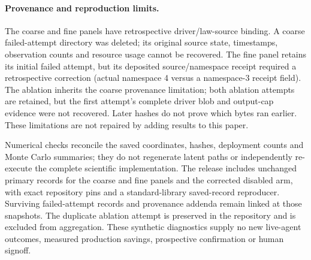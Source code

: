 \paragraph{Provenance and reproduction limits.}
The coarse and fine panels have retrospective driver/law-source binding. A coarse
failed-attempt directory was deleted; its original source state, timestamps,
observation counts and resource usage cannot be recovered. The fine panel retains
its initial failed attempt, but its deposited source/namespace receipt required a
retrospective correction (actual namespace 4 versus a namespace-3 receipt field).
The ablation inherits the coarse provenance limitation; both ablation attempts
are retained, but the first attempt's complete driver blob and output-cap evidence
were not recovered. Later hashes do not prove which bytes ran earlier. These
limitations are not repaired by adding results to this paper.

Numerical checks reconcile the saved coordinates, hashes, deployment counts and
Monte Carlo summaries; they do not regenerate latent paths or independently
re-execute the complete scientific implementation. The release includes unchanged
primary records for the coarse and fine panels and the corrected disabled arm,
with exact repository pins and a standard-library saved-record reproducer.
Surviving failed-attempt records and provenance addenda remain linked at those snapshots.
The duplicate ablation attempt is preserved in the repository and is excluded
from aggregation. These synthetic diagnostics supply no new live-agent outcomes,
measured production savings, prospective confirmation or human signoff.
